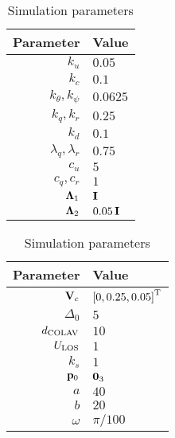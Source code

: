 \begin{table}[t]
    \centering
    \begin{tabular}[t]{r|l}
        {\bf Parameter} & {\bf Value} \\ \hline
        $k_u$ & $0.05$ \\
        $k_c$ & $0.1$ \\
        $k_{\theta}, k_{\psi}$ & $0.0625$ \\
        $k_q, k_r$ & $0.25$ \\
        $k_d$ & $0.1$ \\
        $\lambda_q, \lambda_r$ & $0.75$ \\
        $c_u$ & $5$ \\
        $c_q, c_r$ & $1$ \\
        $\bm{\Lambda}_1$ & $\mathbf{I}$ \\
        $\bm{\Lambda}_2$ & $0.05\,\mathbf{I}$
    \end{tabular}
    \begin{tabular}[t]{r|l}
        {\bf Parameter} & {\bf Value} \\ \hline
        $\mathbf{V}_c$ & $\left[0, 0.25, 0.05\right]^{\mathrm{T}}$ \\
        $\Delta_0$ & $5$ \\
        $d_{\rm COLAV}$ & $10$ \\
        $U_{\rm LOS}$ & $1$ \\
        $k_{s}$ & $1$ \\
        $\mathbf{p}_0$ & $\mathbf{0}_3$ \\
        $a$ & $40$ \\
        $b$ & $20$ \\
        $\omega$ & $\pi / 100$
    \end{tabular}
    \caption{Simulation parameters}
    \label{tab:nsb_5dof_params}
\end{table}

